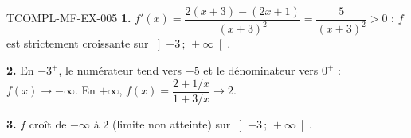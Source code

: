\begin{corrige}{TCOMPL-MF-EX-005}
\textbf{1.} $f'(x)=\dfrac{2(x+3)-(2x+1)}{(x+3)^2}=\dfrac{5}{(x+3)^2}>0$ :
$f$ est strictement croissante sur $\left]-3\,;\,+\infty\right[$.

\textbf{2.} En $-3^+$, le numérateur tend vers $-5$ et le dénominateur vers
$0^+$ : $f(x)\to-\infty$. En $+\infty$, $f(x)=\dfrac{2+1/x}{1+3/x}\to2$.

\textbf{3.} $f$ croît de $-\infty$ à $2$ (limite non atteinte) sur
$\left]-3\,;\,+\infty\right[$.
\end{corrige}
